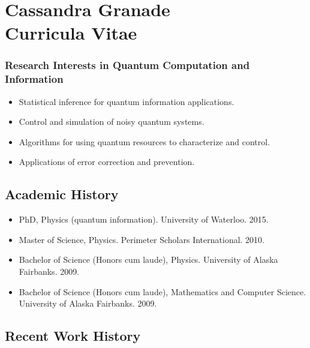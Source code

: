 \documentclass[]{article}
\date{}
\begin{document}
\section{\texorpdfstring{Cassandra Granade\\Curricula
Vitae}{Cassandra Granade Curricula Vitae}}\label{cassandra-granade-curricula-vitae}

\subsubsection{Research Interests in Quantum Computation and
Information}\label{research-interests-in-quantum-computation-and-information}

\begin{itemize}
\itemsep1pt\parskip0pt
\item
  Statistical inference for quantum information applications.
\item
  Control and simulation of noisy quantum systems.
\item
  Algorithms for using quantum resources to characterize and control.
\item
  Applications of error correction and prevention.
\end{itemize}

\subsection{Academic History}\label{academic-history}

\begin{itemize}
\itemsep1pt\parskip0pt
\item
  PhD, Physics (quantum information). University of Waterloo. 2015.
\item
  Master of Science, Physics. Perimeter Scholars International. 2010.
\item
  Bachelor of Science (Honors cum laude), Physics. University of Alaska
  Fairbanks. 2009.
\item
  Bachelor of Science (Honors cum laude), Mathematics and Computer
  Science. University of Alaska Fairbanks. 2009.
\end{itemize}

\subsection{Recent Work History}\label{recent-work-history}
\end{document}
